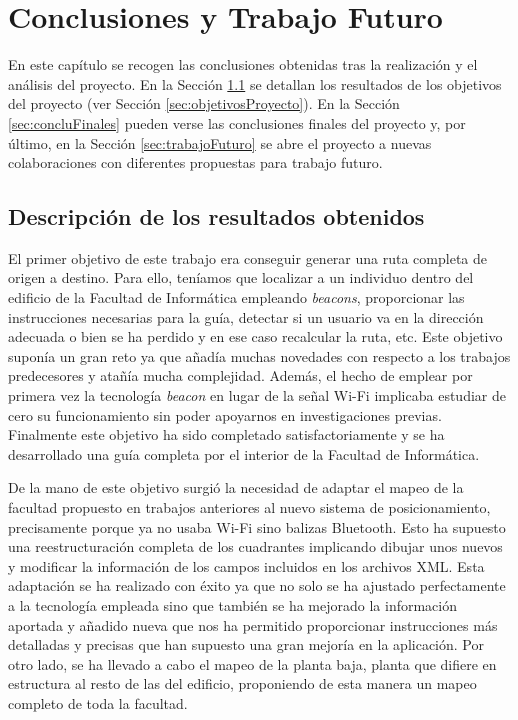 \chapter{Conclusiones y Trabajo Futuro}
\label{cap:conclusiones}

En este capítulo se recogen las conclusiones obtenidas tras la realización y el análisis del proyecto. En la Sección \ref{sec:descResult} se detallan los resultados de los objetivos del proyecto (ver Sección \ref{sec:objetivosProyecto}). En la Sección \ref{sec:concluFinales} pueden verse las conclusiones finales del proyecto y, por último, en la Sección \ref{sec:trabajoFuturo} se abre el proyecto a nuevas colaboraciones con diferentes propuestas para trabajo futuro.

\section{Descripción de los resultados obtenidos}
\label{sec:descResult}
El primer objetivo de este trabajo era conseguir generar una ruta completa de origen a destino. Para ello, teníamos que localizar a un individuo dentro del edificio de la Facultad de Informática empleando \textit{beacons}, proporcionar las instrucciones necesarias para la guía, detectar si un usuario va en la dirección adecuada o bien se ha perdido y en ese caso recalcular la ruta, etc. Este objetivo suponía un gran reto ya que añadía muchas novedades con respecto a los trabajos predecesores y atañía mucha complejidad. Además, el hecho de emplear por primera vez la tecnología \textit{beacon} en lugar de la señal Wi-Fi implicaba estudiar de cero su funcionamiento sin poder apoyarnos en investigaciones previas. Finalmente este objetivo ha sido completado satisfactoriamente y se ha desarrollado una guía completa por el interior de la Facultad de Informática.

De la mano de este objetivo surgió la necesidad de adaptar el mapeo de la facultad propuesto en trabajos anteriores al nuevo sistema de posicionamiento, precisamente porque ya no usaba Wi-Fi sino balizas Bluetooth. Esto ha supuesto una reestructuración completa de los cuadrantes implicando dibujar unos nuevos y modificar la información de los campos incluidos en los archivos XML. Esta adaptación se ha realizado con éxito ya que no solo se ha ajustado perfectamente a la tecnología empleada sino que también se ha mejorado la información aportada y añadido nueva que nos ha permitido proporcionar instrucciones más detalladas y precisas que han supuesto una gran mejoría en la aplicación. Por otro lado, se ha llevado a cabo el mapeo de la planta baja, planta que difiere en estructura al resto de las del edificio, proponiendo de esta manera un mapeo completo de toda la facultad.

